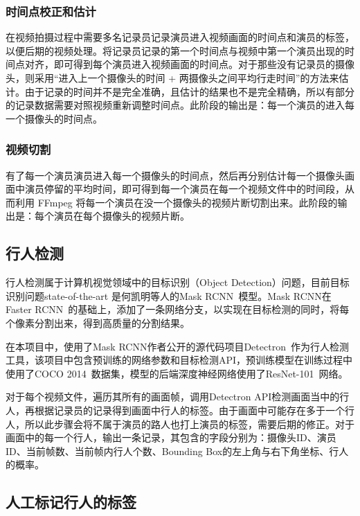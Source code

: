 \subsubsection{时间点校正和估计}

在视频拍摄过程中需要多名记录员记录演员进入视频画面的时间点和演员的标签，以便后期的视频处理。将记录员记录的第一个时间点与视频中第一个演员出现的时间点对齐，即可得到每个演员进入视频画面的时间点。对于那些没有记录员的摄像头，则采用“进入上一个摄像头的时间 + 两摄像头之间平均行走时间”的方法来估计。由于记录的时间并不是完全准确，且估计的结果也不是完全精确，所以有部分的记录数据需要对照视频重新调整时间点。此阶段的输出是：每一个演员的进入每一个摄像头的时间点。

\subsubsection{视频切割}

有了每一个演员演员进入每一个摄像头的时间点，然后再分别估计每一个摄像头画面中演员停留的平均时间，即可得到每一个演员在每一个视频文件中的时间段，从而利用 FFmpeg 将每一个演员在没一个摄像头的视频片断切割出来。此阶段的输出是：每个演员在每个摄像头的视频片断。

\subsection{行人检测}

行人检测属于计算机视觉领域中的目标识别（Object Detection）问题，目前目标识别问题state-of-the-art 是何凯明等人的Mask RCNN~\cite{he2017mask}模型。Mask RCNN在Faster RCNN~\cite{ren2015faster}的基础上，添加了一条网络分支，以实现在目标检测的同时，将每个像素分割出来，得到高质量的分割结果。

在本项目中，使用了Mask RCNN作者公开的源代码项目Detectron~\cite{Detectron2018}作为行人检测工具，该项目中包含预训练的网络参数和目标检测API，预训练模型在训练过程中使用了COCO 2014~\cite{lin2014microsoft}数据集，模型的后端深度神经网络使用了ResNet-101~\cite{he2016deep}网络。

对于每个视频文件，遍历其所有的画面帧，调用Detectron API检测画面当中的行人，再根据记录员的记录得到画面中行人的标签。由于画面中可能存在多于一个行人，所以此步骤会将不属于演员的路人也打上演员的标签，需要后期的修正。对于画面中的每一个行人，输出一条记录，其包含的字段分别为：摄像头ID、演员ID、当前帧数、当前帧内行人个数、Bounding Box的左上角与右下角坐标、行人的概率。

\subsection{人工标记行人的标签}

